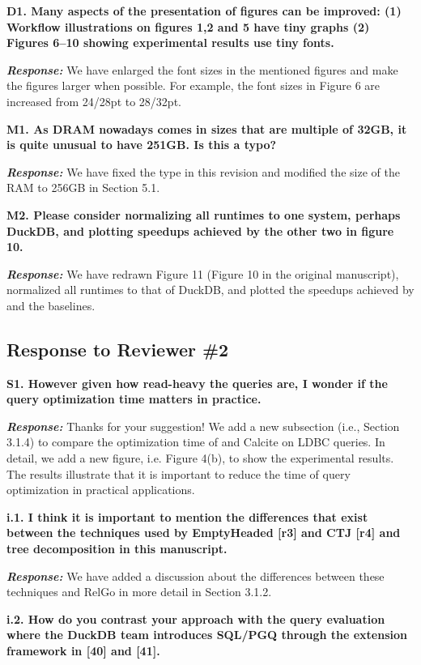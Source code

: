 \textbf{D1. Many aspects of the presentation of figures can be improved: 
(1) Workflow illustrations on figures 1,2 and 5 have tiny graphs
(2) Figures 6--10 showing experimental results use tiny fonts.}

\textbf{\textit{Response: }}
We have enlarged the font sizes in the mentioned figures and make the figures larger when possible.
For example, the font sizes in Figure 6 are increased from 24/28pt to 28/32pt.


\textbf{M1. As DRAM nowadays comes in sizes that are multiple of 32GB, it is quite unusual to have 251GB. Is this a typo?}

\textbf{\textit{Response: }}
We have fixed the type in this revision and modified the size of the RAM to 256GB in Section 5.1.

\textbf{M2. Please consider normalizing all runtimes to one system, perhaps DuckDB, and plotting speedups achieved by the other two in figure 10.}

\textbf{\textit{Response: }}
We have redrawn Figure 11 (Figure 10 in the original manuscript), normalized all runtimes to that of DuckDB, and plotted the speedups achieved by \name and the baselines.


\subsection{Response to Reviewer \#2}

\textbf{S1. However given how read-heavy the queries are, I wonder if the query optimization time matters in practice.}

\textbf{\textit{Response: }}
Thanks for your suggestion! We add a new subsection (i.e., Section 3.1.4) to compare the optimization time of \name and Calcite on LDBC queries.
In detail, we add a new figure, i.e. Figure 4(b), to show the experimental results.
The results illustrate that it is important to reduce the time of query optimization in practical applications. 



\textbf{
i.1. I think it is important to mention the differences that exist between the techniques used by EmptyHeaded [r3] and CTJ [r4]  and tree decomposition in this manuscript.}

\textbf{\textit{Response: }}
We have added a discussion about the differences between these techniques and RelGo in more detail in Section 3.1.2.


\textbf{i.2. How do you contrast your approach with the query evaluation where the DuckDB team introduces SQL/PGQ through the extension framework in [40] and [41].}

